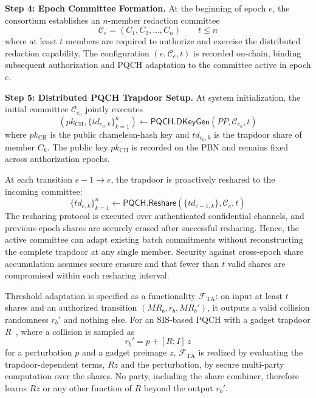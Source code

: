 \documentclass[lettersize,journal]{IEEEtran}
\begin{document}
\textbf{Step 4: Epoch Committee Formation.}
At the beginning of epoch $e$, the consortium establishes an
$n$-member redaction committee
\begin{equation}
\mathcal{C}_e=(C_1,C_2,\ldots,C_n)\qquad t\leq n
\end{equation}
where at least $t$ members are required to authorize and exercise the
distributed redaction capability. The configuration
$(e,\mathcal{C}_e,t)$ is recorded on-chain, binding subsequent
authorization and PQCH adaptation to the committee active in epoch $e$.

\textbf{Step 5: Distributed PQCH Trapdoor Setup.}
At system initialization, the initial committee
$\mathcal{C}_{e_0}$ jointly executes
\begin{equation}
(pk_{\mathrm{CH}},\{td_{e_0,k}\}_{k=1}^{n})
\leftarrow
\mathsf{PQCH.DKeyGen}(PP,\mathcal{C}_{e_0},t)
\end{equation}
where $pk_{\mathrm{CH}}$ is the public chameleon-hash key and
$td_{e_0,k}$ is the trapdoor share of member $C_k$.
The public key $pk_{\mathrm{CH}}$ is recorded on the PBN and remains
fixed across authorization epochs.

At each transition $e-1\rightarrow e$, the trapdoor is proactively
reshared to the incoming committee:
\begin{equation}
\{td_{e,k}\}_{k=1}^{n}
\leftarrow
\mathsf{PQCH.Reshare}
(\{td_{e-1,k}\},\mathcal{C}_e,t)
\end{equation}
The resharing protocol is executed over authenticated confidential
channels, and previous-epoch shares are securely erased after successful
resharing. Hence, the active committee can adapt existing batch
commitments without reconstructing the complete trapdoor at any single
member. Security against cross-epoch share accumulation assumes secure
erasure and that fewer than $t$ valid shares are compromised within
each resharing interval.

Threshold adaptation is specified as a functionality
$\mathcal{F}_{\mathrm{TA}}$: on input at least $t$ shares and an
authorized transition $(MR_b,r_b,MR_b')$, it outputs a valid collision
randomness $r_b'$ and nothing else. For an SIS-based PQCH with a gadget
trapdoor $R$~\cite{ref10,ref17}, where a collision is sampled as
\begin{equation}
r_b'=p+[R;I]\,z
\end{equation}
for a perturbation $p$ and a gadget preimage $z$,
$\mathcal{F}_{\mathrm{TA}}$ is realized by evaluating the
trapdoor-dependent terms, $Rz$ and the perturbation, by secure
multi-party computation over the shares. No party, including the share
combiner, therefore learns $Rz$ or any other function of $R$ beyond the
output $r_b'$.
\end{document}
